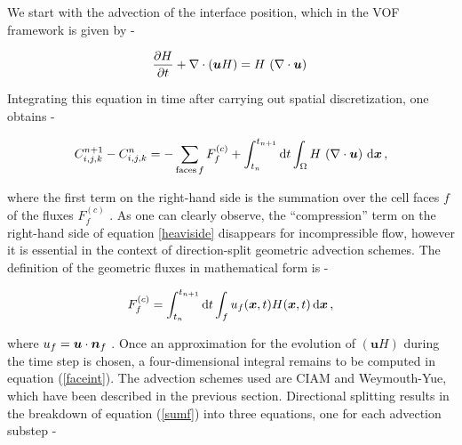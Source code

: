 We start with the advection of the interface position, which in 
the VOF framework is given by - 



\begin{align}
	\frac{\partial H}{\partial t} + \nabla \cdot (\boldsymbol{u} H) = H\, \left(\nabla \cdot \boldsymbol{u} \right) \,
	\label{heaviside}
\end{align}


Integrating this equation in time after carrying 
out spatial discretization, one obtains -    




\begin{align}
{C_{i,j,k}^{n+1} - C_{i,j,k}^{n}} = - \sum_{\textrm{faces} \, f} F^{(c)}_f + \int_{t_n}^{t_{n+1}}  
	{\textrm{d}}t \int_\Omega  H \, \left(\nabla \cdot \boldsymbol{u}\right) \,  {\textrm {d}}\boldsymbol{x}   \,,
\label{sumf}
\end{align}


where the first term on the right-hand side is the summation over the cell faces $f$  
of the fluxes $F^{(c)}_f$   
 . 
As one can clearly observe, the ``compression'' term on the 
right-hand side of equation \eqref{heaviside} disappears for incompressible flow, 
however it is essential in the context of direction-split geometric advection schemes.
The definition of the geometric fluxes in mathematical form is -  

\begin{align}
	F_f^{(c)} = \int_{t_n}^{t_{n+1}} {\textrm {d}}t \int_{f} u_f(\boldsymbol{x},t) H(\boldsymbol{x},t) \, {\textrm{d}}\boldsymbol{x} \,,
\label{faceint}
\end{align}

where $u_f = \boldsymbol{u}\cdot \boldsymbol{n}_f$ 
.
Once an approximation for the evolution of $(\boldsymbol{u} H)$ during
the time step is chosen, a four-dimensional integral remains to be
computed in equation (\ref{faceint}).
The advection schemes used are CIAM and Weymouth-Yue, which have been 
described in the previous section. 
Directional splitting results in the breakdown of equation (\ref{sumf}) 
into three equations, one for each advection substep -



